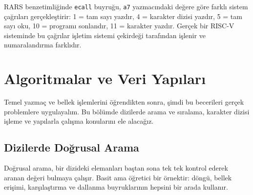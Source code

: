 \begin{bilginot}
RARS benzetimliğinde \texttt{ecall} buyruğu, \texttt{a7} yazmacındaki değere göre farklı sistem çağrıları gerçekleştirir: 1 = tam sayı yazdır, 4 = karakter dizisi yazdır, 5 = tam sayı oku, 10 = programı sonlandır, 11 = karakter yazdır. Gerçek bir RISC-V sisteminde bu çağrılar işletim sistemi çekirdeği tarafından işlenir ve numaralandırma farklıdır.
\end{bilginot}


\section{Algoritmalar ve Veri Yapıları}
\label{sec:algoritmalar}

Temel yazmaç ve bellek işlemlerini öğrendikten sonra, şimdi bu becerileri gerçek problemlere uygulayalım. Bu bölümde dizilerde arama ve sıralama, karakter dizisi işleme ve yapılarla çalışma konularını ele alacağız.

\subsection{Dizilerde Doğrusal Arama}
\label{subsec:dogrusal-arama}

Doğrusal arama, bir dizideki elemanları baştan sona tek tek kontrol ederek aranan değeri bulmaya çalışır. Basit ama öğretici bir örnektir: döngü, bellek erişimi, karşılaştırma ve dallanma buyruklarının hepsini bir arada kullanır.

